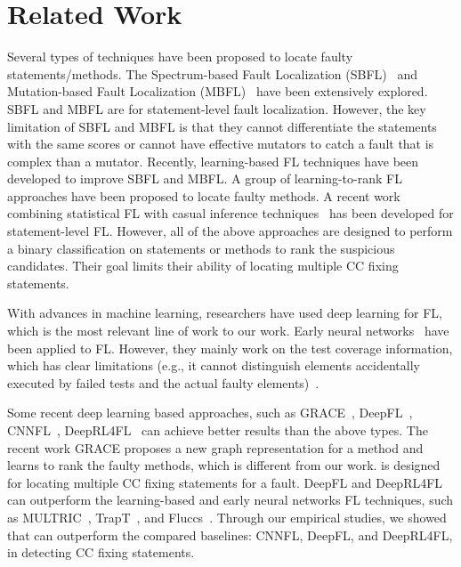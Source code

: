 \section{Related Work}

Several types of techniques have been proposed to locate faulty
statements/methods. The Spectrum-based Fault Localization
(SBFL)~\cite{zhang2011localizing, abreu2007accuracy,
  jones2005empirical, abreu2006evaluation, naish2011model,
  wong2007effective, liblit2005scalable, lucia2014extended} and
Mutation-based Fault Localization
(MBFL)~\cite{papadakis2015metallaxis,MUSE, zhang2013injecting,
  budd1981mutation, zhang2010test, musco2017large} have been
extensively explored. SBFL and MBFL are for
statement-level fault localization. However, the key limitation of
SBFL and MBFL is that they cannot differentiate the statements with
the same scores or cannot have effective mutators to catch a fault
that is complex than a mutator. Recently, learning-based FL techniques
have been developed to improve SBFL and MBFL.
A group of learning-to-rank
FL~\cite{MULTRIC,TraPT,b2016learning,sohn2017fluccs} approaches have
been proposed to locate faulty methods.
A recent work combining statistical FL with casual inference
techniques~\cite{kuccuk2021improving} has been developed for
statement-level FL. However, all of the above approaches are designed
to perform a binary classification on statements or methods to rank
the suspicious candidates. Their goal limits their ability of locating
multiple CC fixing statements.

With advances in machine learning, researchers have used deep learning
for FL, which is the most relevant line of work to our work. Early
neural networks~\cite{zheng2016fault, briand2007using, zhang2017deep,
  wong2009bp} have been applied to FL.  However, they mainly work on
the test coverage information, which has clear limitations (e.g., it
cannot distinguish elements accidentally executed by failed tests and
the actual faulty elements)~\cite{TraPT}.

Some recent deep learning based approaches, such as
GRACE~\cite{lou2021boosting}, DeepFL~\cite{DeepFL},
CNNFL~\cite{zhang2019cnn}, DeepRL4FL~\cite{icse21-fl} can achieve
better results than the above types. The recent work GRACE proposes a
new graph representation for a method and learns to rank the faulty
methods, which is different from our work. {\tool} is designed for
locating multiple CC fixing statements for a fault. DeepFL and
DeepRL4FL can outperform the learning-based and early neural networks
FL techniques, such as MULTRIC~\cite{MULTRIC}, TrapT~\cite{TraPT}, and
Fluccs~\cite{sohn2017fluccs}. Through our empirical studies, we showed
that {\tool} can outperform the compared baselines: CNNFL, DeepFL, and
DeepRL4FL, in detecting CC fixing statements.


